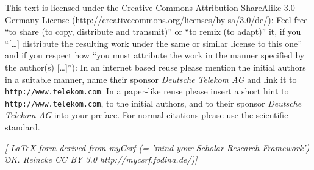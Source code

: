 %
%
%
%
%


This text is licensed under the Creative Commons Attribution-ShareAlike 3.0 Germany
License (http://creativecommons.org/licenses/by-sa/3.0/de/): Feel free \enquote{to
share (to copy, distribute and transmit)} or \enquote{to remix (to
adapt)} it, if you \enquote{[\ldots] distribute the resulting work under the
same or similar license to this one} and if you respect how \enquote{you
must attribute the work in the manner specified by the author(s)
[\ldots]}):
\newline
In an internet based reuse please mention the initial authors in a suitable
manner, name their sponsor \textit{Deutsche Telekom AG} and link it to
\texttt{http://www.telekom.com}. In a paper-like reuse please insert a short
hint to \texttt{http://www.telekom.com}, to the initial authors, and to their
sponsor \textit{Deutsche Telekom AG} into your preface. For normal citations
please use the scientific standard.

\newline
{\tiny \itshape [ LaTeX form derived from myCsrf (= 'mind your Scholar Research
Framework') \copyright K. Reincke CC BY 3.0  http://mycsrf.fodina.de/)] }


